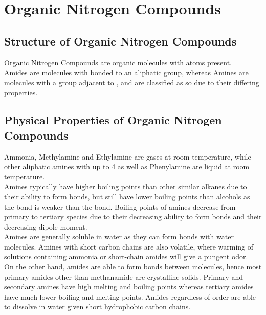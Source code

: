 \documentclass[../main]{subfiles}
\begin{document}
\section{Organic Nitrogen Compounds}

	\subsection{Structure of Organic Nitrogen Compounds}

	Organic Nitrogen Compounds are organic molecules with  atoms present. \\

	Amides are molecules with  bonded to an aliphatic group, whereas Amines are molecules with a  group adjacent to , and are classified as so due to their differing properties.

	\subsection{Physical Properties of Organic Nitrogen Compounds}

	Ammonia, Methylamine and Ethylamine are gases at room temperature, while other aliphatic amines with up to 4  as well as Phenylamine are liquid at room temperature. \\

	Amines typically have higher boiling points than other similar alkanes due to their ability to form  bonds, but still have lower boiling points than alcohols as the  bond is weaker than the  bond. Boiling points of amines decrease from primary to tertiary species due to their decreasing ability to form  bonds and their decreasing dipole moment. \\

	Amines are generally soluble in water as they can form  bonds with water molecules. Amines with short carbon chains are also volatile, where warming of solutions containing ammonia or short-chain amides will give a pungent odor. \\

	On the other hand, amides are able to form  bonds between molecules, hence most primary amides other than methanamide are crystalline solids. Primary and secondary amines have high melting and boiling points whereas tertiary amides have much lower boiling and melting points. Amides regardless of order are able to dissolve in water given short hydrophobic carbon chains. \\
\end{document}
